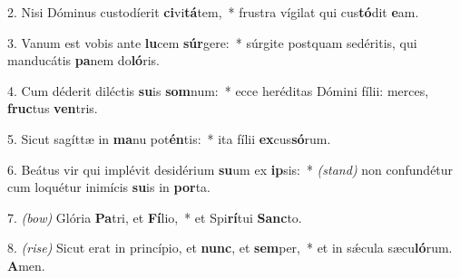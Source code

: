 2. Nisi Dóminus custodíerit \textbf{ci}vi\textbf{tá}tem,~* frustra vígilat qui cus\textbf{tó}dit \textbf{e}am.

3. Vanum est vobis ante \textbf{lu}cem \textbf{súr}gere:~* súrgite postquam sedéritis, qui manducátis \textbf{pa}nem do\textbf{ló}ris.

4. Cum déderit diléctis \textbf{su}is \textbf{som}num:~* ecce heréditas Dómini fílii: merces, \textbf{fruc}tus \textbf{ven}tris.

5. Sicut sagíttæ in \textbf{ma}nu pot\textbf{én}tis:~* ita fílii \textbf{ex}cus\textbf{só}rum.

6. Beátus vir qui implévit desidérium \textbf{su}um ex \textbf{ip}sis:~* {\color{red}\textit{(stand)}} non confundétur cum loquétur inimícis \textbf{su}is in \textbf{por}ta.

7. {\color{red}\textit{(bow)}} Glória \textbf{Pa}tri, et \textbf{Fí}lio,~* et Spi\textbf{rí}tui \textbf{Sanc}to.

8. {\color{red}\textit{(rise)}} Sicut erat in princípio, et \textbf{nunc}, et \textbf{sem}per,~* et in sǽcula sæcu\textbf{ló}rum. \textbf{A}men.